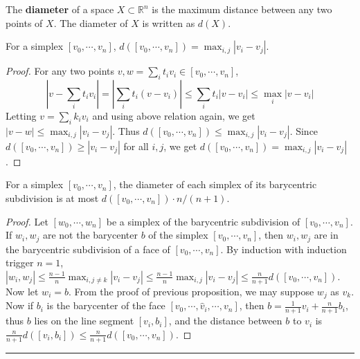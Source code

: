 \begin{defn} The \textbf{diameter} of a space $X\subset \mathbb{R}^n$ is the maximum distance between any two points of $X$. The diameter of $X$ is written as $d(X)$.
\end{defn}

\begin{prop} For a simplex $[v_0,\cdots,v_n]$, $d([v_0,\cdots,v_n])=\max_{i,j}|v_i-v_j|$.
\end{prop}
\begin{proof} For any two points $v,w=\sum_i t_i v_i\in [v_0,\cdots,v_n]$,
\begin{equation}
|v-\sum_i t_i v_i|=|\sum_i t_i(v-v_i)|\leq \sum_i t_i |v-v_i|\leq \max_i |v-v_i|
\end{equation}
Letting $v=\sum_i k_i v_i$ and using above relation again, we get $|v-w|\leq \max_{i,j}|v_i-v_j|$. Thus $d([v_0,\cdots,v_n])\leq \max_{i,j}|v_i-v_j|$. Since $d([v_0,\cdots,v_n])\geq |v_i-v_j|$ for all $i,j$, we get $d([v_0,\cdots,v_n])=\max_{i,j}|v_i-v_j|$.
\end{proof}

\begin{prop} For a simplex $[v_0,\cdots,v_n]$, the diameter of each simplex of its barycentric subdivision is at most $d([v_0,\cdots,v_n])\cdot n/(n+1)$.
\end{prop}
\begin{proof}
Let $[w_0,\cdots,w_n]$ be a simplex of the barycentric subdivision of $[v_0,\cdots,v_n]$. If $w_i,w_j$ are not the barycenter $b$ of the simplex $[v_0,\cdots,v_n]$, then $w_i,w_j$ are in the barycentric subdivision of a face of $[v_0,\cdots,v_n]$. By induction with induction trigger $n=1$, $|w_i,w_j|\leq \frac{n-1}{n}\max_{i,j\neq k}|v_i-v_j|\leq \frac{n-1}{n}\max_{i,j}|v_i-v_j|\leq \frac{n}{n+1}d([v_0,\cdots,v_n])$. Now let $w_i=b$. From the proof of previous proposition, we may suppose $w_j$ as $v_k$. Now if $b_i$ is the barycenter of the face $[v_0,\cdots,\hat{v}_i,\cdots,v_n]$, then $b=\frac{1}{n+1}v_i+\frac{n}{n+1}b_i$, thus $b$ lies on the line segment $[v_i,b_i]$, and the distance between $b$ to $v_i$ is $\frac{n}{n+1}d([v_i,b_i])\leq \frac{n}{n+1}d([v_0,\cdots,v_n])$.
\end{proof}
\noindent\rule{\textwidth}{1pt}
\newline